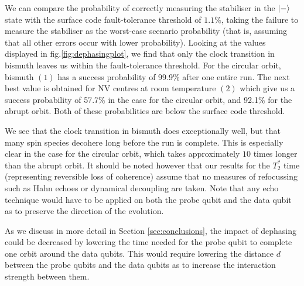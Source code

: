 We can compare the probability of correctly measuring the stabiliser in the $\ket{-}$ state with the surface code fault-tolerance threshold of $1.1\%$, taking the failure to measure the stabiliser as the worst-case scenario probability (that is, assuming that all other errors occur with lower probability). Looking at the values displayed in fig.\@ \ref{fig:dephasingplot}, we find that only the clock transition in bismuth leaves us within the fault-tolerance threshold. For the circular orbit, bismuth $(1)$ has a success probability of  99.9\% after one entire run. The next best value is obtained for NV centres at room temperature $(2)$ which give us a success probability of 57.7\% in the case for the circular orbit, and 92.1\% for the abrupt orbit. Both of these probabilities are below the surface code threshold. 

We see that the clock transition in bismuth does exceptionally well, but that many spin species decohere long before the run is complete. This is especially clear in the case for the circular orbit, which takes approximately $10$ times longer than the abrupt orbit. It should be noted however that our results for the $T_2^*$ time (representing reversible loss of coherence) assume that no measures of refocussing such as Hahn echoes \cite{levitt1979nmr} or dynamical decoupling \cite{viola1998dynamical} are taken. Note that any echo technique would have to be applied on both the probe qubit and the data qubit as to preserve the direction of the evolution. 

As we discuss in more detail in Section \ref{sec:conclusions}, the impact of dephasing could be decreased by lowering the time needed for the probe qubit to complete one orbit around the data qubits. This would require lowering the distance $d$ between the probe qubits and the data qubits as to increase the interaction strength between them. 














